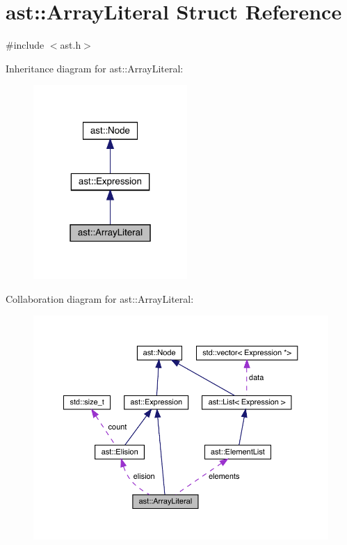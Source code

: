 \hypertarget{structast_1_1_array_literal}{}\section{ast\+:\+:Array\+Literal Struct Reference}
\label{structast_1_1_array_literal}


{\ttfamily \#include $<$ast.\+h$>$}



Inheritance diagram for ast\+:\+:Array\+Literal\+:
\nopagebreak
\begin{figure}[H]
\begin{center}
\leavevmode
\includegraphics[width=166pt]{structast_1_1_array_literal__inherit__graph}
\end{center}
\end{figure}


Collaboration diagram for ast\+:\+:Array\+Literal\+:
\nopagebreak
\begin{figure}[H]
\begin{center}
\leavevmode
\includegraphics[width=350pt]{structast_1_1_array_literal__coll__graph}
\end{center}
\end{figure}
